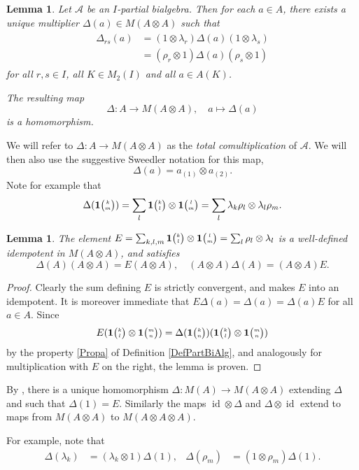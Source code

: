 \documentclass[10pt]{article}
\DeclareMathOperator{\id}{id}
\newcommand{\Grt}[3]{#1{\tiny{\begin{pmatrix} #2\\#3\end{pmatrix}}}}
\newcommand{\UnitC}[2]{\Grt{\mathbf{1}}{#1}{#2}}
\newtheorem{Lem}[Theorem]{Lemma}
\theoremstyle{definition}
\numberwithin{equation}{section}
\begin{document}
\begin{Lem} Let $\mathscr{A}$ be an $I$-partial bialgebra. Then for each $a\in A$, there exists a unique multiplier $\Delta(a) \in M(A\otimes A)$ such that \begin{align}\label{EqDel}
    \begin{aligned}
      \Delta_{rs}(a) &= (1\otimes \lambda_r)\Delta(a)(1\otimes
      \lambda_s) \\ &= (\rho_r\otimes 1)\Delta(a)(\rho_s\otimes 1)
    \end{aligned}
\end{align}  for all $r,s\in I$, all $K\in M_2(I)$ and all $a\in A(K)$. 

The resulting map \[\Delta:A\rightarrow M(A\otimes A),\quad a\mapsto \Delta(a)\] is a homomorphism.
\end{Lem} 

We will refer to $\Delta: A\rightarrow M(A\otimes A)$ as the
\emph{total comultiplication} of $\mathscr{A}$. We will then also use
the suggestive Sweedler notation for this map, \[\Delta(a) =
a_{(1)}\otimes a_{(2)}.\]  Note for example that \[\Delta(\UnitC{k}{m}) = \sum_{l}\UnitC{k}{l}\otimes \UnitC{l}{m} = \sum_l \lambda_k\rho_l\otimes \lambda_l\rho_m.\]

\begin{Lem} The element $E = \sum_{k,l,m} \UnitC{k}{l}\otimes \UnitC{l}{m}= \sum_l \rho_l\otimes \lambda_l$ is a well-defined idempotent in $M(A\otimes A)$, and satisfies \[\Delta(A)(A\otimes A)=E(A\otimes A),\quad (A\otimes A)\Delta(A)= (A\otimes A)E.\]
\end{Lem} 
\begin{proof} Clearly the sum defining $E$ is strictly convergent, and makes $E$ into an idempotent. It is moreover immediate that $E\Delta(a)=\Delta(a) = \Delta(a)E$ for all $a\in A$. Since \[E(\UnitC{k}{l}\otimes \UnitC{m}{n}) = \Delta(\UnitC{k}{n})(\UnitC{k}{l}\otimes \UnitC{m}{n}) \] by the property \ref{Propa} of Definition \ref{DefPartBiAlg}, and analogously for multiplication with $E$ on the right, the lemma is proven. 
\end{proof} 

By \cite[Proposition A.3]{VDW2}, there is a unique homomorphism $\Delta:M(A)\rightarrow M(A\otimes A)$ extending $\Delta$ and such that $\Delta(1) = E$.  Similarly the maps $\id\otimes \Delta$ and $\Delta\otimes \id$ extend to maps from $M(A\otimes A)$ to $M(A\otimes A\otimes A)$. 

For example, note that
\begin{align} \label{eq:delta-lambda-rho} \Delta(\lambda_{k}) &=
  (\lambda_{k} \otimes 1)\Delta(1), & \Delta(\rho_{m}) &= (1 \otimes \rho_{m})\Delta(1).
\end{align}
\end{document}

